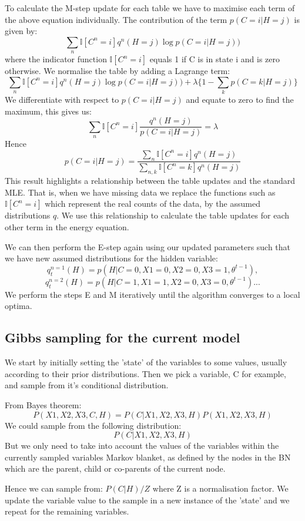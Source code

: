 \documentclass[12pt]{article} %
\begin{document}
To calculate the M-step update for each table we have to maximise each term of the above equation individually. The contribution of the term $p(C=i|H=j)$ is given by:
$$
\displaystyle\sum_{n}\mathbb{I}[C^n=i]q^n(H=j) \log p(C=i|H=j))
$$
where the indicator function $\mathbb{I}[C^n=i]$ equals 1 if C is in state i and is zero otherwise.
We normalise the table by adding a Lagrange term:
$$
\displaystyle\sum_{n}\mathbb{I}[C^n=i]q^n(H=j) \log p(C=i|H=j))
+ \lambda\{1-\sum_{k}p(C=k|H=j)\}
$$
We differentiate with respect to $p(C=i|H=j)$ and equate to zero to find the maximum, this gives us:
$$
\displaystyle\sum_{n}\mathbb{I}[C^n=i] \frac{q^n(H=j)}{p(C=i|H=j)} = \lambda
$$
Hence
$$
p(C=i|H=j)=
\frac{\sum_{n}\mathbb{I}[C^n=i]q^n(H=j)}{\sum_{n,k}\mathbb{I}[C^n=k]q^n(H=j)}
$$
This result highlights a relationship between the table updates and the standard MLE. That is, when we have missing data we replace the functions such as $\mathbb{I}[C^n=i]$ which represent the real counts of the data, by the assumed distributions $q$. We use this relationship to calculate the table updates for each other term in the energy equation.

We can then perform the E-step again using our updated parameters such that we have new assumed distributions for the hidden variable:
$$
q_{t}^{n=1}(H)=p(H|C=0,X1=0,X2=0,X3=1,\theta^{t-1}),
$$
$$
q_{t}^{n=2}(H)=p(H|C=1,X1=1,X2=0,X3=0,\theta^{t-1})...
$$
We perform the steps E and M iteratively until the algorithm converges to a local optima.

\subsection{Gibbs sampling for the current model}
We start by initially setting the 'state' of the variables to some values, usually according to their prior distributions. Then we pick a variable, C for example, and sample from it's conditional distribution.

From Bayes theorem:
$$
P(X1,X2,X3,C,H)=
P(C|X1,X2,X3,H)
P(X1,X2,X3,H)
$$
We could sample from the following distribution:
$$
P(C|X1,X2,X3,H)
$$
But we only need to take into account the values of the variables within the currently sampled variables Markov blanket, as defined by the nodes in the BN which are the parent, child or co-parents of the current node.

Hence we can sample from: $P(C|H)/Z$ where Z is a normalisation factor. We update the variable value to the sample in a new instance of the 'state' and we repeat for the remaining variables.
\end{document}
